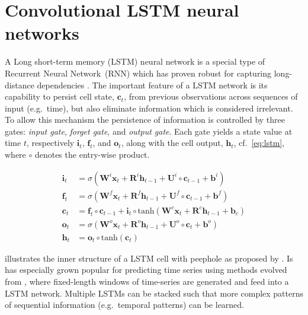\documentclass[preprint,11pt,5p,twocolumn]{elsarticle}
\newcommand{\matr}[1]{\mathbf{#1}}
\begin{document}
\section{Convolutional LSTM neural networks}
\label{sec:convlstm}
A Long short-term memory (LSTM) neural network is a special type of Recurrent Neural Network~(RNN) which has proven robust for capturing long-distance dependencies \cite{Lstm1,Lstm2}. The important feature of a LSTM network is its capability to persist cell state, $\matr{c}_t$, from previous observations across sequences of input (e.g.\ time), but also eliminate information which is considered irrelevant. To allow this mechanism the persistence of information is controlled by three gates: \emph{input gate}, \emph{forget gate}, and \emph{output gate}. Each gate yields a state value at time $t$, respectively $\matr{i}_t$, $\matr{f}_t$, and $\matr{o}_t$, along with the cell output, $\matr{h}_t$, cf.~\cref{eq:lstm}, where $\circ$ denotes the entry-wise product.

\begin{equation}
\begin{aligned}
  \matr{i}_t &= \sigma \left( \matr{W}^i \matr{x}_t + \matr{R}^i \matr{h}_{t-1} + \matr{U}^i \circ \matr{c}_{t-1} + \matr{b}^i \right) \\
  \matr{f}_t &= \sigma \left( \matr{W}^f \matr{x}_t + \matr{R}^f \matr{h}_{t-1} + \matr{U}^f \circ \matr{c}_{t-1} + \matr{b}^f \right) \\
  \matr{c}_t &= \matr{f}_t \circ \matr{c}_{t-1} + \matr{i}_t \circ \mathrm{tanh} \left( \matr{W}^c \matr{x}_t + \matr{R}^c \matr{h}_{t-1} + \matr{b}_c \right) \\
  \matr{o}_t &= \sigma \left( \matr{W}^\mathit{o} \matr{x}_t + \matr{R}^\mathit{o} \matr{h}_{t-1} + \matr{U}^\mathit{o} \circ \matr{c}_{t} + \matr{b}^o \right) \\
  \matr{h}_t &= \matr{o}_t \circ \mathrm{tanh} \left( \matr{c}_t \right)
\end{aligned}
\label{eq:lstm}
\end{equation}
\vspace{.5em}

 illustrates the inner structure of a LSTM cell with peephole as proposed by \cite{LstmPeephole}. 
Is has especially grown popular for predicting time series using methods evolved from \cite{LstmTs}, where fixed-length windows of time-series are generated and feed into a LSTM network. Multiple LSTMs can be stacked such that more complex patterns of sequential information (e.g.\ temporal patterns) can be learned.
\end{document}
